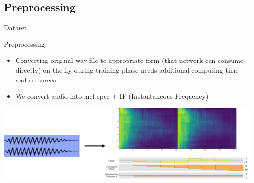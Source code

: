\subsection{Preprocessing}
\begin{frame}{Dataset}
    \begin{block}{Preprocessing}
        \begin{itemize}
            \item Converting original wav file to appropriate form (that network can consume directly) on-the-fly during training phase needs additional computing time and resources.
            \item We convert audio into mel spec + IF (Instantaneous Frequency)
        \end{itemize}
        \centering
        \includegraphics[scale=0.3]{Presentation/figures/dataset_preprocessing.png}
    \end{block}
\end{frame}